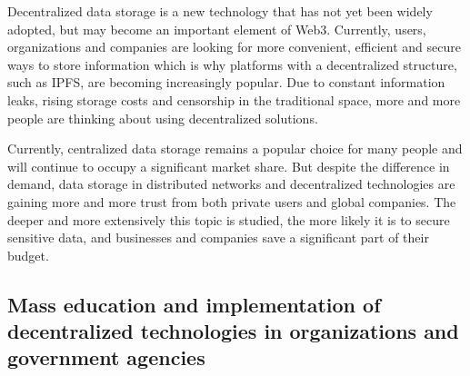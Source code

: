 \documentclass[10pt,conference,a4paper]{IEEEtran_EDM}
\begin{document}
Decentralized data storage is a new technology that has not yet been widely adopted, but may become an important element of Web3.
Currently, users, organizations and companies are looking for more convenient, efficient and secure ways to store information which is why platforms with a decentralized structure, such as IPFS, are becoming increasingly popular.
Due to constant information leaks, rising storage costs and censorship in the traditional space, more and more people are thinking
about using decentralized solutions.

Currently, centralized data storage remains a popular choice for many people and will continue to occupy a significant market share.
But despite the difference in demand, data storage in distributed networks and decentralized technologies are gaining more and more trust from both private users and global companies. The deeper and more extensively this topic is studied, the more likely it is to secure sensitive data, and businesses and companies save a significant part of their budget.

\subsection{Mass education and implementation of decentralized technologies in organizations and government agencies }
\end{document}
